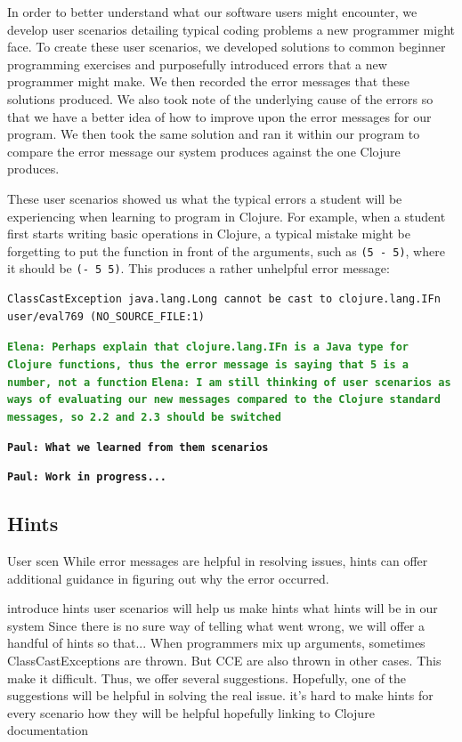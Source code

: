 \documentclass[12pt]{article}
\newcommand{\comment}[1]{{\bf \tt  {#1}}}
\newcommand{\emcomment}[1]{\textcolor{ForestGreen}{\comment{Elena: {#1}}}}
\newcommand{\pscomment}[1]{\textcolor{Coquelicot}{\comment{Paul: {#1}}}}
\begin{document}
In order to better understand what our software users might encounter, we develop user scenarios detailing typical coding problems a new programmer might face.
To create these user scenarios, we developed solutions to common beginner programming exercises and purposefully introduced errors that a new programmer might make.
We then recorded the error messages that these solutions produced.
We also took note of the underlying cause of the errors so that we have a better idea of how to improve upon the error messages for our program.
We then took the same solution and ran it within our program to compare the error message our system produces against the one Clojure produces.  

These user scenarios showed us what the typical errors a student will be experiencing when learning to program in Clojure.
For example, when a student first starts writing basic operations in Clojure, a typical mistake might be forgetting to put the function in front of the arguments,
such as \texttt{(5 - 5)}, where it should be \texttt{(- 5 5)}. 
This produces a rather unhelpful error message: 

\begin{verbatim}
ClassCastException java.lang.Long cannot be cast to clojure.lang.IFn
user/eval769 (NO_SOURCE_FILE:1)
\end{verbatim}
\emcomment{Perhaps explain that clojure.lang.IFn is a Java type for Clojure functions, thus the error message is saying that 5 is a number, not a function}
\emcomment{I am still thinking of user scenarios as ways of evaluating our new messages compared to the Clojure standard messages, so 2.2 and 2.3 should be switched}

\pscomment{What we learned from them scenarios}

\pscomment{Work in progress...}

\subsection{Hints}\label{sec:hints}

User scen
While error messages are helpful in resolving issues, hints can offer additional guidance in figuring out why the error occurred. 

introduce hints
user scenarios will help us make hints
what hints will be in our system
Since there is no sure way of telling what went wrong, we will offer a handful of hints so that...
When programmers mix up arguments, sometimes ClassCastExceptions are thrown. But CCE are also thrown in other cases. This make it difficult. Thus, we offer several suggestions. Hopefully, one of the suggestions will be helpful in solving the real issue.
it's hard to make hints for every scenario
how they will be helpful
hopefully linking to Clojure documentation
\end{document}
